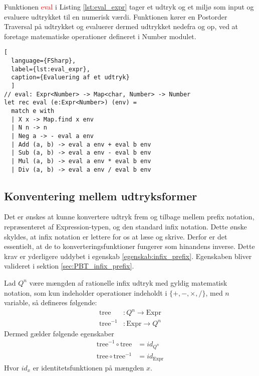 Funktionen \textcolor{red}{eval} i Listing \ref{lst:eval_expr} tager et udtryk og et miljø som input og evaluere udtrykket til en numerisk værdi. Funktionen kører en Postorder Traversal på udtrykket og evaluerer dermed udtrykket nedefra og op, ved at foretage matematiske operationer defineret i Number modulet. 

\begin{lstlisting}[
  language={FSharp}, 
  label={lst:eval_expr}, 
  caption={Evaluering af et udtryk}
  ]
// eval: Expr<Number> -> Map<char, Number> -> Number
let rec eval (e:Expr<Number>) (env) =
  match e with
  | X x -> Map.find x env
  | N n -> n
  | Neg a -> - eval a env
  | Add (a, b) -> eval a env + eval b env
  | Sub (a, b) -> eval a env - eval b env
  | Mul (a, b) -> eval a env * eval b env
  | Div (a, b) -> eval a env / eval b env
\end{lstlisting}

\subsection{Konventering mellem udtryksformer}\label{sec:expression_generation}
Det er ønskes at kunne konvertere udtryk frem og tilbage mellem prefix notation, repræsenteret af Expression-typen, og den standard infix notation. Dette ønske skyldes, at infix notation er lettere for os at læse og skrive. Derfor er det essentielt, at de to konverteringsfunktioner fungerer som hinandens inverse. Dette krav er yderligere uddybet i egenskab \ref{egenskab:infix_prefix}. Egenskaben bliver valideret i sektion \ref{sec:PBT_infix_prefix}.

\vspace{0.5cm}
\begin{egenskab}\label{egenskab:infix_prefix}
    Lad $Q^n$ være mængden af rationelle infix udtryk med gyldig matematisk notation, som kun indeholder operationer indeholdt i $\{+, -, \times, /\}$, med $n$ variable, så defineres følgende:
    \begin{align*}
      \text{tree}&: Q^n \to \text{Expr} \\
      \text{tree}^{-1}&: \text{Expr} \to  Q^n  
    \end{align*}
    Dermed gælder følgende egenskaber
    \begin{align*}
      \text{tree}^{-1} \circ \text{tree} &= id_{Q^n} \\
      \text{tree} \circ \text{tree}^{-1} &= id_{\text{Expr}}
    \end{align*}
    Hvor $id_{x}$ er identitetsfunktionen på mængden $x$.
\end{egenskab}

